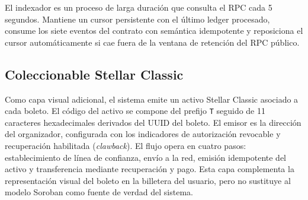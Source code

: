 El indexador es un proceso de larga duración que consulta el RPC cada 5 segundos. Mantiene un cursor
persistente con el último ledger procesado, consume los siete eventos del contrato con semántica idempotente
y reposiciona el cursor automáticamente si cae fuera de la ventana de retención del RPC público.

\subsection{Coleccionable Stellar Classic}

Como capa visual adicional, el sistema emite un activo Stellar Classic asociado a cada boleto. El código del
activo se compone del prefijo \texttt{T} seguido de 11 caracteres hexadecimales derivados del UUID del
boleto. El emisor es la dirección del organizador, configurada con los indicadores de autorización revocable
y recuperación habilitada (\textit{clawback}). El flujo opera en cuatro pasos: establecimiento de línea de
confianza, envío a la red, emisión idempotente del activo y transferencia mediante recuperación y pago. Esta
capa complementa la representación visual del boleto en la billetera del usuario, pero no sustituye al modelo
Soroban como fuente de verdad del sistema.
